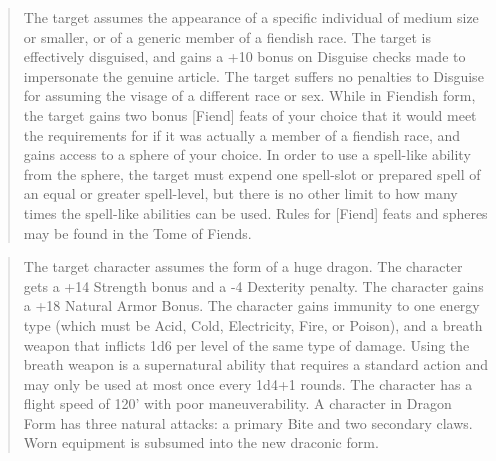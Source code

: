 \begin{quote}
\begin{small}
\end{small}

The target assumes the appearance of a specific individual of medium size or smaller, or of a generic member of a fiendish race. The target is effectively disguised, and gains a +10 bonus on Disguise checks made to impersonate the genuine article. The target suffers no penalties to Disguise for assuming the visage of a different race or sex. While in Fiendish form, the target gains two bonus [Fiend] feats of your choice that it would meet the requirements for if it was actually a member of a fiendish race, and gains access to a sphere of your choice. In order to use a spell-like ability from the sphere, the target must expend one spell-slot or prepared spell of an equal or greater spell-level, but there is no other limit to how many times the spell-like abilities can be used. Rules for [Fiend] feats and spheres may be found in the Tome of Fiends.
\end{quote}


\begin{quote}
\begin{small}
\end{small}

The target character assumes the form of a huge dragon. The character gets a +14 Strength bonus and a -4 Dexterity penalty. The character gains a +18 Natural Armor Bonus. The character gains immunity to one energy type (which must be Acid, Cold, Electricity, Fire, or Poison), and a breath weapon that inflicts 1d6 per level of the same type of damage. Using the breath weapon is a supernatural ability that requires a standard action and may only be used at most once every 1d4+1 rounds. The character has a flight speed of 120' with poor maneuverability. A character in Dragon Form has three natural attacks: a primary Bite and two secondary claws. Worn equipment is subsumed into the new draconic form.
\end{quote}

